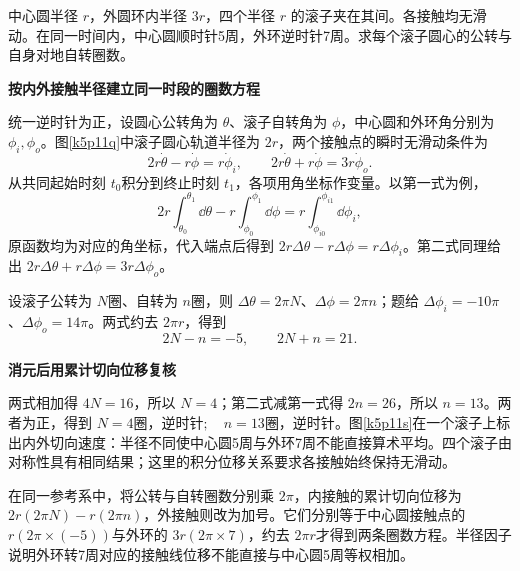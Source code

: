 \begin{question}\begin{example}[两个圆环驱动四个滚子]\label{k5p11}
中心圆半径 $r$，外圆环内半径 $3r$，四个半径 $r$ 的滚子夹在其间。各接触均无滑动。在同一时间内，中心圆顺时针5周，外环逆时针7周。求每个滚子圆心的公转与自身对地自转圈数。\end{example}
\end{question}
\begin{solution}\textbf{按内外接触半径建立同一时段的圈数方程}\par\nobreak
统一逆时针为正，设圆心公转角为 $\theta$、滚子自转角为 $\phi$，中心圆和外环角分别为 $\phi_i,\phi_o$。图\ref{k5p11q}中滚子圆心轨道半径为 $2r$，两个接触点的瞬时无滑动条件为
\[
 2r\dot\theta-r\dot\phi=r\dot\phi_i,
 \qquad 2r\dot\theta+r\dot\phi=3r\dot\phi_o.
\]
从共同起始时刻 $t_0$积分到终止时刻 $t_1$，各项用角坐标作变量。以第一式为例，
\[
 2r\int_{\theta_0}^{\theta_1}\dd\theta
 -r\int_{\phi_0}^{\phi_1}\dd\phi
 =r\int_{\phi_{i0}}^{\phi_{i1}}\dd\phi_i,
\]
原函数均为对应的角坐标，代入端点后得到 $2r\Delta\theta-r\Delta\phi=r\Delta\phi_i$。第二式同理给出 $2r\Delta\theta+r\Delta\phi=3r\Delta\phi_o$。

设滚子公转为 $N$圈、自转为 $n$圈，则 $\Delta\theta=2\pi N$、$\Delta\phi=2\pi n$；题给 $\Delta\phi_i=-10\pi$、$\Delta\phi_o=14\pi$。两式约去 $2\pi r$，得到
\[2N-n=-5,\qquad 2N+n=21.\]



\par\medskip{}\noindent\textbf{消元后用累计切向位移复核}\par\nobreak
两式相加得 $4N=16$，所以 $N=4$；第二式减第一式得 $2n=26$，所以 $n=13$。两者为正，得到 $\boxed{N=4\text{圈，逆时针};\quad n=13\text{圈，逆时针}}$。图\ref{k5p11s}在一个滚子上标出内外切向速度：半径不同使中心圆5周与外环7周不能直接算术平均。四个滚子由对称性具有相同结果；这里的积分位移关系要求各接触始终保持无滑动。

在同一参考系中，将公转与自转圈数分别乘 $2\pi$，内接触的累计切向位移为 $2r(2\pi N)-r(2\pi n)$，外接触则改为加号。它们分别等于中心圆接触点的 $r(2\pi\times(-5))$与外环的 $3r(2\pi\times7)$，约去 $2\pi r$才得到两条圈数方程。半径因子说明外环转7周对应的接触线位移不能直接与中心圆5周等权相加。\end{solution}

